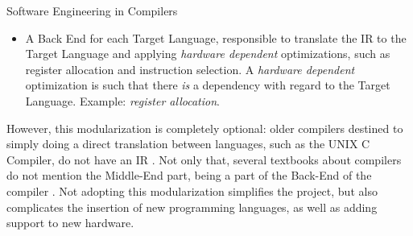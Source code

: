 \begin{section}{Software Engineering in Compilers}
\begin{itemize}
\item A Back End for each Target Language, responsible to translate the IR to
the Target Language and applying \textit{hardware dependent} optimizations,
such as register allocation and instruction selection. A \textit{hardware dependent}
optimization is such that there \textit{is} a dependency with regard to the
Target Language. Example: \textit{register allocation}.

\end{itemize}

%
%

However, this modularization is completely optional: older compilers destined
to simply doing a direct translation between languages, such as the UNIX C
Compiler, do not have an IR \citep{ritchie1979tour}. Not only that, several
textbooks about compilers do not mention the Middle-End part, being a part of
the Back-End of the compiler \citep{dragonbook}. Not adopting this
modularization simplifies the project, but also complicates the insertion of
new programming languages, as well as adding support to new hardware.




\end{section}
